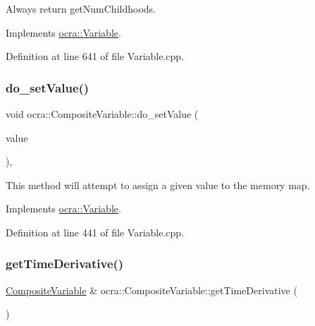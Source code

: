 Always return get\+Num\+Childhoods. 



Implements \hyperlink{classocra_1_1Variable_a65de5b31613b74d83baab58f0eb43b35}{ocra\+::\+Variable}.



Definition at line 641 of file Variable.\+cpp.

\hypertarget{classocra_1_1CompositeVariable_aa2d9ca737bf529e2686ba9a3ee1126e5}{}\label{classocra_1_1CompositeVariable_aa2d9ca737bf529e2686ba9a3ee1126e5} 
\subsubsection{\texorpdfstring{do\+\_\+set\+Value()}{do\_setValue()}}
{\footnotesize\ttfamily void ocra\+::\+Composite\+Variable\+::do\+\_\+set\+Value (\begin{DoxyParamCaption}\item[{const Vector\+Xd \&}]{value }\end{DoxyParamCaption})\hspace{0.3cm}{\ttfamily [protected]}, {\ttfamily [virtual]}}



This method will attempt to assign a given value to the memory map. 



Implements \hyperlink{classocra_1_1Variable_a73ff767d0a620f1803573b33f93c69f8}{ocra\+::\+Variable}.



Definition at line 441 of file Variable.\+cpp.

\hypertarget{classocra_1_1CompositeVariable_ad4c753d254356c1b3686a3da04b0d499}{}\label{classocra_1_1CompositeVariable_ad4c753d254356c1b3686a3da04b0d499} 
\subsubsection{\texorpdfstring{get\+Time\+Derivative()}{getTimeDerivative()}}
{\footnotesize\ttfamily \hyperlink{classocra_1_1CompositeVariable}{Composite\+Variable} \& ocra\+::\+Composite\+Variable\+::get\+Time\+Derivative (\begin{DoxyParamCaption}{ }\end{DoxyParamCaption})\hspace{0.3cm}{\ttfamily [virtual]}}



